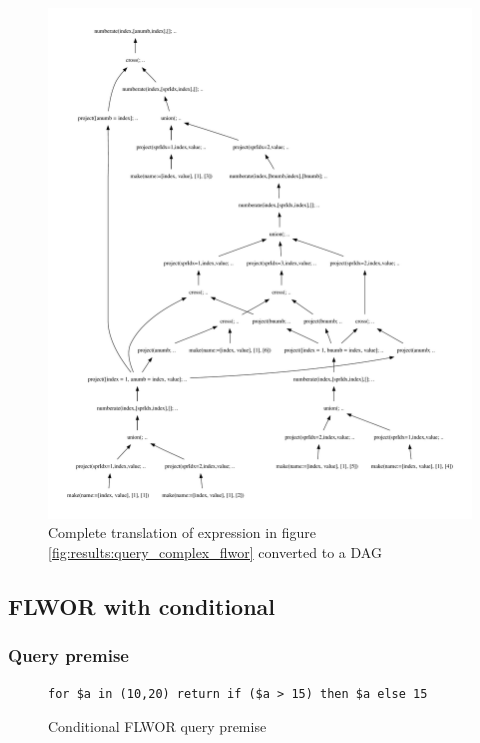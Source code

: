 \begin{figure}[!htp]
\begin{center}
  \includegraphics[width=1.0\textwidth]{img/graphs/td_impl_flwor_complex_xq_relalg_dag}
  \caption{Complete translation of expression in figure
  \ref{fig:results:query_complex_flwor} converted to a DAG}
  \label{fig:results:query_complex_flwor_result_dag}
\end{center}
\end{figure}
\newpage

\subsection{FLWOR with conditional}
\label{sect:results:algebra:generated:conditional_flwor}
\subsubsection{Query premise}
\begin{figure}[!htp]
\begin{center}
\begin{Verbatim}
for $a in (10,20) return if ($a > 15) then $a else 15
\end{Verbatim}
  \caption{Conditional FLWOR query premise}
  \label{fig:results:query_conditional_flwor}
\end{center}
\end{figure}

